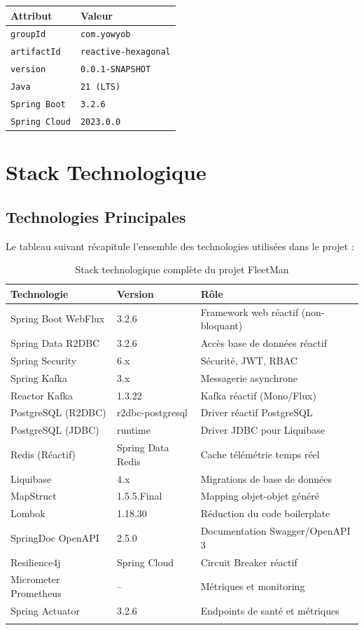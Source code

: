 \documentclass[12pt,a4paper]{report}
\begin{document}
\begin{center}
\begin{tabular}{ll}
\toprule
\textbf{Attribut} & \textbf{Valeur} \\
\midrule
\texttt{groupId}    & \texttt{com.yowyob} \\
\texttt{artifactId} & \texttt{reactive-hexagonal} \\
\texttt{version}    & \texttt{0.0.1-SNAPSHOT} \\
\texttt{Java}       & \texttt{21 (LTS)} \\
\texttt{Spring Boot} & \texttt{3.2.6} \\
\texttt{Spring Cloud} & \texttt{2023.0.0} \\
\bottomrule
\end{tabular}
\end{center}

\section{Stack Technologique}

\subsection{Technologies Principales}

Le tableau suivant récapitule l'ensemble des technologies utilisées dans le projet :

\begin{longtable}{p{4cm}p{3.5cm}p{6cm}}
\toprule
\textbf{Technologie} & \textbf{Version} & \textbf{Rôle} \\
\midrule
\endhead
Spring Boot WebFlux & 3.2.6 & Framework web réactif (non-bloquant) \\
Spring Data R2DBC & 3.2.6 & Accès base de données réactif \\
Spring Security & 6.x & Sécurité, JWT, RBAC \\
Spring Kafka & 3.x & Messagerie asynchrone \\
Reactor Kafka & 1.3.22 & Kafka réactif (Mono/Flux) \\
PostgreSQL (R2DBC) & r2dbc-postgresql & Driver réactif PostgreSQL \\
PostgreSQL (JDBC) & runtime & Driver JDBC pour Liquibase \\
Redis (Réactif) & Spring Data Redis & Cache télémétrie temps réel \\
Liquibase & 4.x & Migrations de base de données \\
MapStruct & 1.5.5.Final & Mapping objet-objet généré \\
Lombok & 1.18.30 & Réduction du code boilerplate \\
SpringDoc OpenAPI & 2.5.0 & Documentation Swagger/OpenAPI 3 \\
Resilience4j & Spring Cloud & Circuit Breaker réactif \\
Micrometer Prometheus & -- & Métriques et monitoring \\
Spring Actuator & 3.2.6 & Endpoints de santé et métriques \\
\bottomrule
\caption{Stack technologique complète du projet FleetMan}
\end{longtable}
\end{document}
